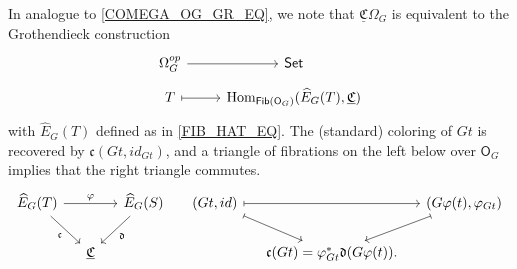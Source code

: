 \documentclass[a4paper,10pt
,draft
]{article}%
\renewcommand{\phi}{\varphi}
\newcommand{\UC}{\underline{\mathfrak C}}
\renewcommand{\1}{\ensuremath{\mathbb{id}}}
\renewcommand{\hat}{\widehat}
\begin{document}
\begin{remark}
      In analogue to \eqref{COMEGA_OG_GR_EQ}, we note that $\UC \Omega_G$ is equivalent to the Grothendieck construction
      \begin{equation}
            \label{COMEGAG_OG_GR_EQ}
            \begin{tikzcd}[row sep = tiny]
                  \Omega_G^{op} \arrow[r]
                  &
                  \mathsf{Set}
                  \\
                  T \arrow[r, mapsto]
                  &
                  \Hom_{\mathsf{Fib} (\mathsf O_G)}(\hat E_G(T), \UC)
            \end{tikzcd}
      \end{equation}
      with $\hat E_G(T)$ defined as in \eqref{FIB_HAT_EQ}.
      The (standard) coloring of $G t$ is recovered by $\mathfrak c(G t, id_{G t})$, and
      a triangle of fibrations on the left below over $\mathsf O_G$
      implies that the right triangle commutes.
      \begin{equation}
            \begin{tikzcd}[column sep = small]
                  \hat E_G(T) \arrow[rr, "\phi"] \arrow[dr, "\mathfrak c"']
                  &&
                  \hat E_G(S) \arrow[dl, "\mathfrak d"]
                  &
                  (G t, id) \arrow[rr, mapsto] \arrow[dr, mapsto]
                  &&
                  (G \phi(t), \phi_{G t}) \arrow[dl, mapsto]
                  \\
                  &
                  \UC
                  &
                  &
                  &
                  \mathfrak c(G t) = \phi_{G t}^{\**} \mathfrak d(G \phi(t)).
            \end{tikzcd}
      \end{equation}
\end{remark}
\end{document}
